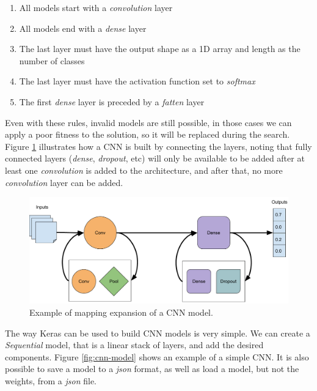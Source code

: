 \documentclass[12pt]{article}
\begin{document}
\begin{enumerate}
	\item All models start with a \textit{convolution} layer
	
	\item All models end with a \textit{dense} layer
	
	\item The last layer must have the output shape as a 1D array and length as the number of classes
	
	\item The last layer must have the activation function set to \textit{softmax}
	
	\item The first \textit{dense} layer is preceded by a \textit{fatten} layer
\end{enumerate}


Even with these rules, invalid models are still possible, in those cases we can apply a poor fitness to the solution, so it will be replaced during the search. Figure \ref{fig:cnn-map-scheme} illustrates how a CNN is built by connecting the layers, noting that fully connected layers (\textit{dense}, \textit{dropout}, etc) will only be available to be added after at least one \textit{convolution} is added to the architecture, and after that, no more \textit{convolution} layer can be added.


\begin{figure}[!htb]
	\includegraphics[width=\linewidth]{images/mapping-example.pdf}
	\caption{Example of mapping expansion of a CNN model.}
	\label{fig:cnn-map-scheme}
\end{figure}


The way Keras can be used to build CNN models is very simple. We can create a \textit{Sequential} model, that is a linear stack of layers, and add the desired components. Figure \ref{fig:cnn-model} shows an example of a simple CNN. It is also possible to save a model to a \textit{json} format, as well as load a model, but not the weights, from a \textit{json} file.
\end{document}
